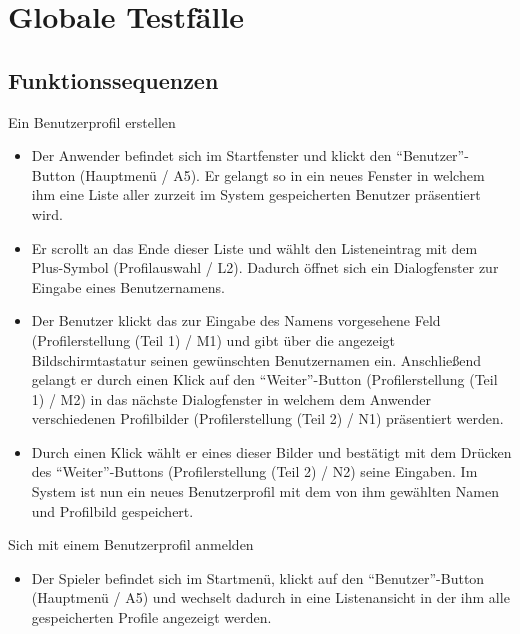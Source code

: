 \section{Globale Testfälle}

\subsection{Funktionssequenzen}

\begin{requirements}

	 Ein Benutzerprofil erstellen
	
	
	\begin{itemize}
  			\item Der Anwender befindet sich im Startfenster und klickt den "`Benutzer"'-Button (Hauptmenü / A5). Er gelangt so in ein neues Fenster in welchem ihm eine Liste aller zurzeit im System gespeicherten Benutzer präsentiert wird.
  			
  			\item Er scrollt an das Ende dieser Liste und wählt den Listeneintrag mit dem Plus-Symbol (Profilauswahl / L2). Dadurch öffnet sich ein Dialogfenster zur Eingabe eines Benutzernamens.
  			
  			\item Der Benutzer klickt das zur Eingabe des Namens vorgesehene Feld (Profilerstellung (Teil 1) / M1) und gibt über die angezeigt Bildschirmtastatur seinen gewünschten Benutzernamen ein. Anschließend gelangt er durch einen Klick auf den "`Weiter"'-Button (Profilerstellung (Teil 1) / M2) in das nächste Dialogfenster in welchem dem Anwender verschiedenen Profilbilder (Profilerstellung (Teil 2) / N1) präsentiert werden.
  			
  			\item Durch einen Klick wählt er eines dieser Bilder und bestätigt mit dem Drücken des "`Weiter"'-Buttons (Profilerstellung (Teil 2) / N2) seine Eingaben. Im System ist nun ein neues Benutzerprofil mit dem von ihm gewählten Namen und Profilbild gespeichert.
  	\end{itemize}
  	
  	
  	
  	 Sich mit einem Benutzerprofil anmelden
  	
  	\begin{itemize}
  			\item Der Spieler befindet sich im Startmenü, klickt auf den "`Benutzer"'-Button (Hauptmenü / A5) und wechselt dadurch in eine Listenansicht in der ihm alle gespeicherten Profile angezeigt werden.
  			

\end{itemize}
\end{requirements}
